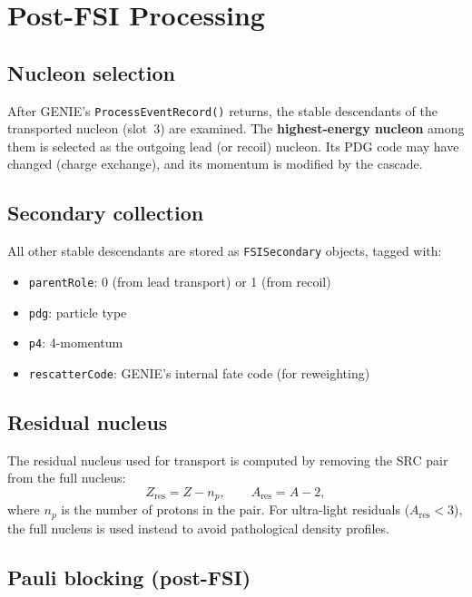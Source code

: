 \documentclass[11pt,a4paper]{article}
\begin{document}
\section{Post-FSI Processing}

\subsection{Nucleon selection}

After GENIE's \texttt{ProcessEventRecord()} returns, the stable
descendants of the transported nucleon (slot~3) are examined.  The
\textbf{highest-energy nucleon} among them is selected as the outgoing
lead (or recoil) nucleon.  Its PDG code may have changed (charge
exchange), and its momentum is modified by the cascade.

\subsection{Secondary collection}

All other stable descendants are stored as \texttt{FSISecondary} objects,
tagged with:
\begin{itemize}[nosep]
  \item \texttt{parentRole}: 0 (from lead transport) or 1 (from recoil)
  \item \texttt{pdg}: particle type
  \item \texttt{p4}: 4-momentum
  \item \texttt{rescatterCode}: GENIE's internal fate code (for reweighting)
\end{itemize}

\subsection{Residual nucleus}

The residual nucleus used for transport is computed by removing the SRC
pair from the full nucleus:
\begin{equation}
  Z_{\text{res}} = Z - n_{p}, \qquad
  A_{\text{res}} = A - 2,
\end{equation}
where $n_{p}$ is the number of protons in the pair.  For ultra-light
residuals ($A_{\text{res}} < 3$), the full nucleus is used instead to
avoid pathological density profiles.

\subsection{Pauli blocking (post-FSI)}
\end{document}
